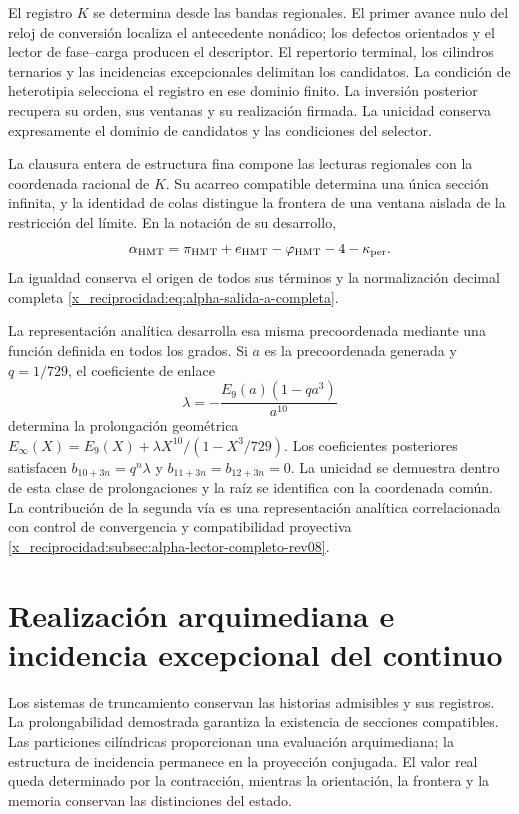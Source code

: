 El registro \(K\) se determina desde las bandas regionales. El
primer avance nulo del reloj de conversión localiza el antecedente
nonádico; los defectos orientados y el lector de fase--carga
producen el descriptor. El repertorio terminal, los cilindros
ternarios y las incidencias excepcionales delimitan los candidatos.
La condición de heterotipia selecciona el registro en ese dominio
finito. La inversión posterior recupera su orden, sus ventanas y
su realización firmada. La unicidad conserva expresamente el
dominio de candidatos y las condiciones del selector.

La clausura entera de estructura fina compone las lecturas
regionales con la coordenada racional de \(K\). Su acarreo
compatible determina una única sección infinita, y la identidad
de colas distingue la frontera de una ventana aislada de la
restricción del límite. En la notación de su desarrollo,
\[
 \alpha_{\rm HMT}
 =\pi_{\rm HMT}+e_{\rm HMT}-\varphi_{\rm HMT}
  -4-\kappa_{\rm per}.
\]
La igualdad conserva el origen de todos sus términos y la
normalización decimal completa
\eqref{x_reciprocidad:eq:alpha-salida-a-completa}.

La representación analítica desarrolla esa misma precoordenada
mediante una función definida en todos los grados. Si \(a\) es la
precoordenada generada y \(q=1/729\), el coeficiente de enlace
\[
 \lambda=-\frac{E_9(a)(1-qa^3)}{a^{10}}
\]
determina la prolongación geométrica
\(E_\infty(X)=E_9(X)+\lambda X^{10}/(1-X^3/729)\).
Los coeficientes posteriores satisfacen
\(b_{10+3n}=q^n\lambda\) y
\(b_{11+3n}=b_{12+3n}=0\).
La unicidad se demuestra dentro de esta clase de prolongaciones
y la raíz se identifica con la coordenada común. La contribución
de la segunda vía es una representación analítica correlacionada
con control de convergencia y compatibilidad proyectiva
\ref{x_reciprocidad:subsec:alpha-lector-completo-rev08}.

\section{Realización arquimediana e incidencia excepcional del continuo}

Los sistemas de truncamiento conservan las historias admisibles y
sus registros. La prolongabilidad demostrada garantiza la
existencia de secciones compatibles. Las particiones cilíndricas
proporcionan una evaluación arquimediana; la estructura de
incidencia permanece en la proyección conjugada. El valor real
queda determinado por la contracción, mientras la orientación,
la frontera y la memoria conservan las distinciones del estado.

